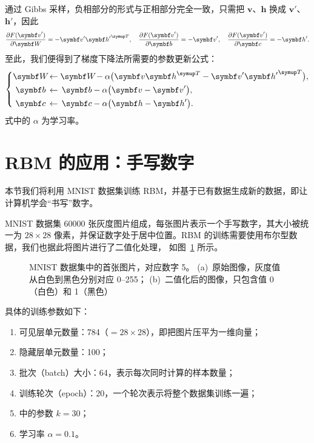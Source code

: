 通过 Gibbs 采样，负相部分的形式与正相部分完全一致，只需把 $\bm{v}$、$\bm{h}$ 换成 $\bm{v}'$、
$\bm{h}'$，因此
\begin{equation}
  \pdv{F(\bm{v}')}{\bm{W}} = - \bm{v}' {\bm{h}'}^\trans \qc
  \pdv{F(\bm{v}')}{\bm{b}} = - \bm{v}' \qc
  \pdv{F(\bm{v}')}{\bm{c}} = - \bm{h}'.
\end{equation}
至此，我们便得到了梯度下降法所需要的参数更新公式：
\begin{equation}
  \left\{
  \begin{aligned}
    \bm{W} \! &\gets \bm{W} \! - \alpha \qty\big(\bm{v} \bm{h}^\trans
                                                 - \bm{v}' {\bm{h}'}^\trans), \\
    \bm{b} \, &\gets \, \bm{b} - \alpha \qty\big(\bm{v} - \bm{v}'), \\
    \bm{c} \, &\gets \, \bm{c} - \alpha \qty\big(\bm{h} - \bm{h}').
  \end{aligned}
  \right.
\end{equation}
式中的 $\alpha$ 为学习率。

\section{RBM 的应用：手写数字}

本节我们将利用 MNIST 数据集训练 RBM，并基于已有数据生成新的数据，即让计算机学会“书写”数字。

MNIST 数据集 \num{60000} 张灰度图片组成，每张图片表示一个手写数字，其大小被统一为 $28 \times 28$
像素，并保证数字处于居中位置。RBM 的训练需要使用布尔型数据，我们也据此将图片进行了二值化处理，
如图~\ref{fig:mnist-image} 所示。

\begin{figure}[htb]
  \centering
  \begin{subfigure}[b]{0.35\textwidth}
    \centering
    \caption{}
  \end{subfigure}
  \begin{subfigure}[b]{0.35\textwidth}
    \centering
    \caption{}
  \end{subfigure}
  \caption{MNIST 数据集中的首张图片，对应数字 5。
    (a)~原始图像，灰度值从白色到黑色分别对应 0--255；
    (b)~二值化后的图像，只包含值 0（白色）和 1（黑色）}
  \label{fig:mnist-image}
\end{figure}

具体的训练参数如下：

\begin{enumerate}
  \item 可见层单元数量：784（$=28 \times 28$），即把图片压平为一维向量；
  \item 隐藏层单元数量：100；
  \item 批次（batch）大小：64，表示每次同时计算的样本数量；
  \item 训练轮次（epoch）：20，一个轮次表示将整个数据集训练一遍；
  \item \CDk{} 中的参数 $k=30$；
  \item 学习率 $\alpha=0.1$。
\end{enumerate}

